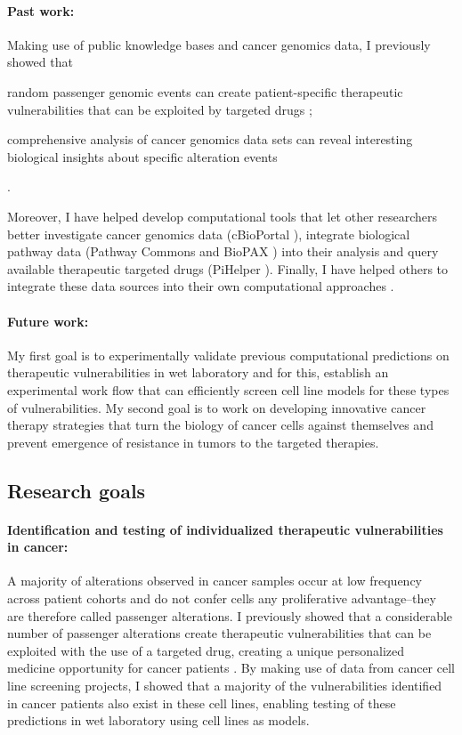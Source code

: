 \documentclass[11pt,letterpaper]{article}
\begin{document}
\paragraph{Past work:}
Making use of public knowledge bases and cancer genomics data, 
I previously showed that 
\begin{inparaenum}[(i)]
 \item random passenger genomic events can create patient-specific therapeutic vulnerabilities that can be exploited by targeted drugs \cite{aksoy2014prediction};
 \item comprehensive analysis of cancer genomics data sets can reveal interesting biological insights about specific alteration events \cite{aksoy2014cancer}
\end{inparaenum}.

Moreover, I have helped develop computational tools that let other researchers better 
investigate cancer genomics data (cBioPortal \cite{gao2013integrative, cerami2012cbio}),
integrate biological pathway data (Pathway Commons and BioPAX \cite{demir2013using,babur2014integrating})
into their analysis and query available therapeutic targeted drugs (PiHelper \cite{aksoy2013pihelper}).
Finally, I have helped others to integrate these data sources into their own computational approaches \cite{ciriello2013emerging,korkut2014perturbation,babur2014systematic}.

\paragraph{Future work:} 
My first goal is to experimentally validate previous computational predictions on therapeutic vulnerabilities in wet laboratory
and for this, establish an experimental work flow that can efficiently screen cell line models for these types of vulnerabilities.
My second goal is to work on developing innovative cancer therapy strategies that turn the biology of cancer cells against themselves and prevent emergence of resistance in tumors to the targeted therapies.

\subsection*{Research goals}
\paragraph{Identification and testing of individualized therapeutic vulnerabilities in cancer:}
A majority of alterations observed in cancer samples occur at low frequency across patient cohorts
and do not confer cells any proliferative advantage--they are therefore called passenger alterations.
I previously showed that a considerable number of passenger alterations create therapeutic vulnerabilities that can be exploited with the use of a targeted drug, creating a unique personalized medicine opportunity for cancer patients \cite{aksoy2014prediction}.
By making use of data from cancer cell line screening projects,
I showed that a majority of the vulnerabilities identified in cancer patients also exist in these cell lines,
enabling testing of these predictions in wet laboratory using cell lines as models.
\end{document}
